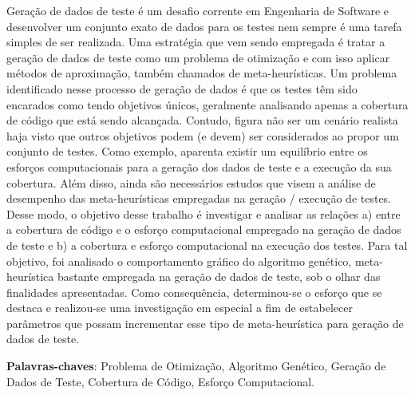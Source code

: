 \begin{resumo}
 
Geração de dados de teste é um desafio corrente em Engenharia de Software e desenvolver um conjunto exato de dados para os testes nem sempre é uma tarefa simples de ser realizada.  Uma estratégia que vem sendo empregada é tratar a geração de dados de teste como um problema de otimização e com isso aplicar métodos de aproximação, também chamados de meta-heurísticas. Um problema identificado nesse processo de geração de dados é que os testes têm sido encarados como tendo objetivos únicos, geralmente analisando apenas a cobertura de código que está sendo alcançada. Contudo, figura não ser um cenário realista haja visto que outros objetivos podem (e devem) ser considerados ao propor um conjunto de testes. Como exemplo, aparenta existir um equilíbrio entre os esforços computacionais para a geração dos dados de teste e a execução da sua cobertura.  Além disso, ainda são necessários estudos que visem a análise de desempenho das meta-heurísticas empregadas na geração / execução de testes. Desse modo, o objetivo desse trabalho é investigar e analisar as relações a) entre a cobertura de código e o esforço computacional empregado na geração de dados de teste e b) a cobertura e esforço computacional na execução dos testes. Para tal objetivo, foi analisado o comportamento gráfico do algoritmo genético, meta-heurística bastante empregada na geração de dados de teste, sob o olhar das finalidades apresentadas. Como consequência, determinou-se o esforço que se destaca e realizou-se uma investigação em especial a fim de estabelecer parâmetros que possam incrementar esse tipo de meta-heurística para  geração de dados de teste. 
 \vspace{\onelineskip}
    
 \noindent
 \textbf{Palavras-chaves}: Problema de Otimização, Algoritmo Genético, Geração de Dados de Teste, Cobertura de Código, Esforço Computacional.
\end{resumo}
